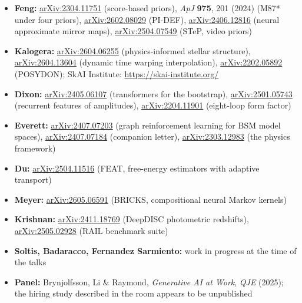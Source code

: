 \documentclass[11pt]{article}
\begin{document}
\begin{itemize}[leftmargin=*]
    \item \textbf{Feng:} \href{https://arxiv.org/abs/2304.11751}{arXiv:2304.11751} (score-based priors), \emph{ApJ} \textbf{975}, 201 (2024) (M87* under four priors), \href{https://arxiv.org/abs/2602.08029}{arXiv:2602.08029} (PI-DEF), \href{https://arxiv.org/abs/2406.12816}{arXiv:2406.12816} (neural approximate mirror maps), \href{https://arxiv.org/abs/2504.07549}{arXiv:2504.07549} (STeP, video priors)
    \item \textbf{Kalogera:} \href{https://arxiv.org/abs/2604.06255}{arXiv:2604.06255} (physics-informed stellar structure), \href{https://arxiv.org/abs/2604.13604}{arXiv:2604.13604} (dynamic time warping interpolation), \href{https://arxiv.org/abs/2202.05892}{arXiv:2202.05892} (POSYDON); SkAI Institute: \url{https://skai-institute.org/}
    \item \textbf{Dixon:} \href{https://arxiv.org/abs/2405.06107}{arXiv:2405.06107} (transformers for the bootstrap), \href{https://arxiv.org/abs/2501.05743}{arXiv:2501.05743} (recurrent features of amplitudes), \href{https://arxiv.org/abs/2204.11901}{arXiv:2204.11901} (eight-loop form factor)
    \item \textbf{Everett:} \href{https://arxiv.org/abs/2407.07203}{arXiv:2407.07203} (graph reinforcement learning for BSM model spaces), \href{https://arxiv.org/abs/2407.07184}{arXiv:2407.07184} (companion letter), \href{https://arxiv.org/abs/2303.12983}{arXiv:2303.12983} (the physics framework)
    \item \textbf{Du:} \href{https://arxiv.org/abs/2504.11516}{arXiv:2504.11516} (FEAT, free-energy estimators with adaptive transport)
    \item \textbf{Meyer:} \href{https://arxiv.org/abs/2605.06591}{arXiv:2605.06591} (BRICKS, compositional neural Markov kernels)
    \item \textbf{Krishnan:} \href{https://arxiv.org/abs/2411.18769}{arXiv:2411.18769} (DeepDISC photometric redshifts), \href{https://arxiv.org/abs/2505.02928}{arXiv:2505.02928} (RAIL benchmark suite)
    \item \textbf{Soltis, Badaracco, Fernandez Sarmiento:} work in progress at the time of the talks
    \item \textbf{Panel:} Brynjolfsson, Li \& Raymond, \emph{Generative AI at Work}, \emph{QJE} (2025); the hiring study described in the room appears to be unpublished
\end{itemize}
\end{document}
